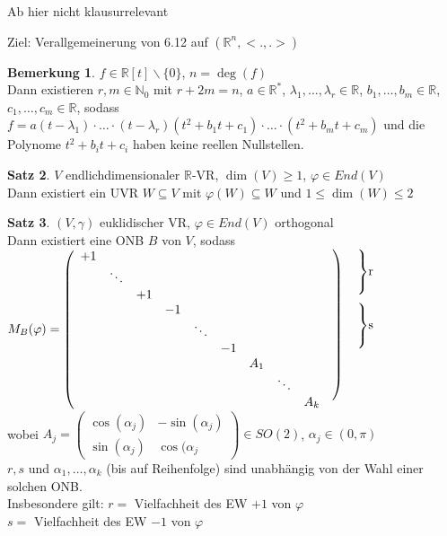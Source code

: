 \documentclass[10pt,a4paper,numbers=endperiod]{scrartcl}
\theoremstyle{definition}
\newtheorem{satz}{Satz}[section]
\newtheorem{bem}[satz]{Bemerkung}
\def\RR{{\mathbb R}}
\def\NN{{\mathbb N}}
\begin{document}
\begin{Large}
	Ab hier nicht klausurrelevant
\end{Large}

Ziel: Verallgemeinerung von 6.12 auf $(\RR^n, <.,.>)$ 

\begin{bem}
	$f \in \RR[t] \backslash \{0\}$, $n = \deg (f)$\\
	Dann existieren $r,m \in \NN_0$ mit $r+2m = n$, $a \in \RR^*$, $\lambda_1, \ldots, \lambda_r \in \RR$, $b_1, \ldots, b_m \in \RR$, $c_1, \ldots, c_m \in \RR$, sodass\\
	$f = a(t - \lambda_1) \cdot \ldots \cdot (t - \lambda_r) (t^2+b_1t+c_1) \cdot \ldots \cdot (t^2 + b_m t + c_m)$ und die Polynome $t^2 + b_it + c_i$ haben keine reellen Nullstellen. 
\end{bem}

\begin{satz}
	$V$ endlichdimensionaler $\RR$-VR, $\dim(V) \geq 1$, $\varphi \in End(V)$\\
	Dann existiert ein UVR $W \subseteq V$ mit $\varphi(W) \subseteq W$ und $1 \leq \dim(W) \leq 2$
\end{satz}
\newpage
\begin{satz}
	$(V, \gamma)$ euklidischer VR, $\varphi \in End(V)$ orthogonal\\
	Dann existiert eine ONB $B$ von $V$, sodass\\
	$M_B (\varphi) = \left(
	\begin{array}{ccccccccccc}
	+1 & & & & & & & & & \rdelim){10}{1em} &\rdelim\}{3}{1cm}[r]\\
	& \ddots & & & & & & & & & \\ 
	& & +1 & & & & & & & & \\
	& & & -1 & & & & & & &  \rdelim\}{3}{1cm}[s]\\
	& & & & \ddots & & & & & &  \\
	& & & & & -1 & & & & &\\
	& & & & & & A_1 & & & &  \\
	& & & & & & & \ddots & & &\\
	& & & & & & & & A_k & &\\
	\end{array}\right.$\\
	wobei $A_j = \begin{pmatrix}
	\cos (\alpha_j) & -\sin (\alpha_j)\\
	\sin (\alpha_j) & \cos (\alpha_j
	\end{pmatrix} \in SO(2)$, $\alpha_j \in (0, \pi)$\\
	$r,s$ und $\alpha_1, \ldots, \alpha_k$ (bis auf Reihenfolge) sind unabhängig von der Wahl einer solchen ONB.\\
	Insbesondere gilt: $r =$ Vielfachheit des EW $+1$ von $\varphi$\\
	$s =$ Vielfachheit des EW $-1$ von $\varphi$
\end{satz}
\end{document}
